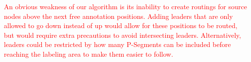 \documentclass[11pt,a4paper]{vutinfth}
\newcommand{\change}[1]{\textcolor{red}{#1}}
\begin{document}
\change{An obvious weakness of our algorithm is its inability to create routings for source nodes above the next free annotation positions. Adding leaders that are only allowed to go down instead of up would allow for these positions to be routed, but would require extra precautions to avoid intersecting leaders. Alternatively, leaders could be restricted by how many P-Segments can be included before reaching the labeling area to make them easier to follow.}



\backmatter %



\end{document}
